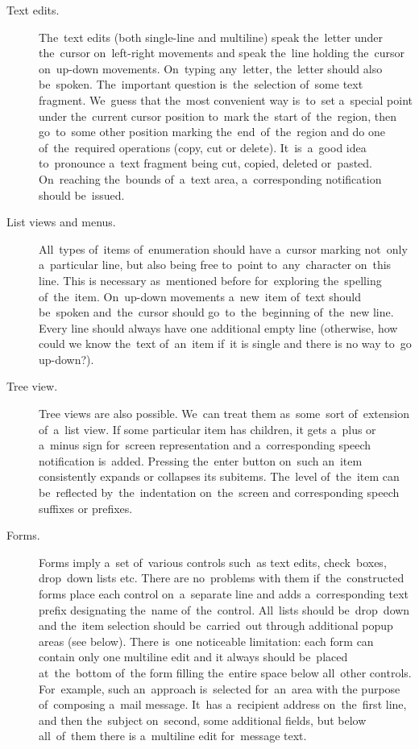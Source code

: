 \documentclass{acm_proc_article-sp}
\begin{document}
\begin{description}

\item[Text edits.]
The~text edits (both single-line and multiline) speak the~letter under the~cursor on~left-right movements 
and speak the~line holding the~cursor on~up-down movements.
On~typing any~letter, the~letter should also be~spoken.
The~important question is~the~selection of~some text fragment.
We~guess that the~most convenient way is~to~set a~special point under the~current cursor position to~mark the~start of~the~region,
then go~to~some other position marking the~end~of~the~region and do one of~the~required operations (copy, cut or delete).
It~is~a~good idea to~pronounce a~text fragment being cut, copied, deleted or~pasted.
On~reaching the~bounds of~a~text area, a~corresponding notification should be~issued.

\item[List views and menus.]  
All~types of~items of~enumeration should  have a~cursor 
marking not~only a~particular line, but also being free to~point to~any~character on~this line.
This is necessary as~mentioned before for~exploring the~spelling of~the~item.
On~up-down movements   a~new~item of~text should be~spoken and~the~cursor should go~to~the~beginning of~the~new line. 
Every line should always have one additional empty line (otherwise, how could we know the~text of~an~item if~it is single and there is no way to~go up-down?).

\item[Tree view.]
Tree views are also possible.
We~can treat them as~some~sort of~extension of~a~list view.
If some particular item has children, it gets a~plus or a~minus sign for~screen representation 
and a~corresponding speech notification is~added.
Pressing the~enter button on~such an~item consistently expands or collapses its subitems.
The~level of~the~item can be~reflected by~the~indentation on~the~screen and corresponding speech suffixes or prefixes.

\item[Forms.]
Forms imply a~set of~various controls such~as text edits, check~boxes, drop~down lists etc.
There are no~problems with them if~the~constructed forms place each control on~a~separate line and adds a~corresponding text prefix 
designating the~name of~the~control.
All~lists should be~drop~down and the~item selection should be~carried~out through additional popup areas (see below).
There is~one noticeable limitation: each form can contain only one multiline edit 
and it always should be~placed at~the~bottom of~the form filling the~entire space below all~other controls.
For~example, such an~approach is~selected for~an~area with the purpose of~composing a~mail message.
It~has a~recipient address on~the~first line, 
and then the~subject on~second, some additional fields,
but below all~of~them there is a~multiline edit for~message text. 
\end{description}
\end{document}
